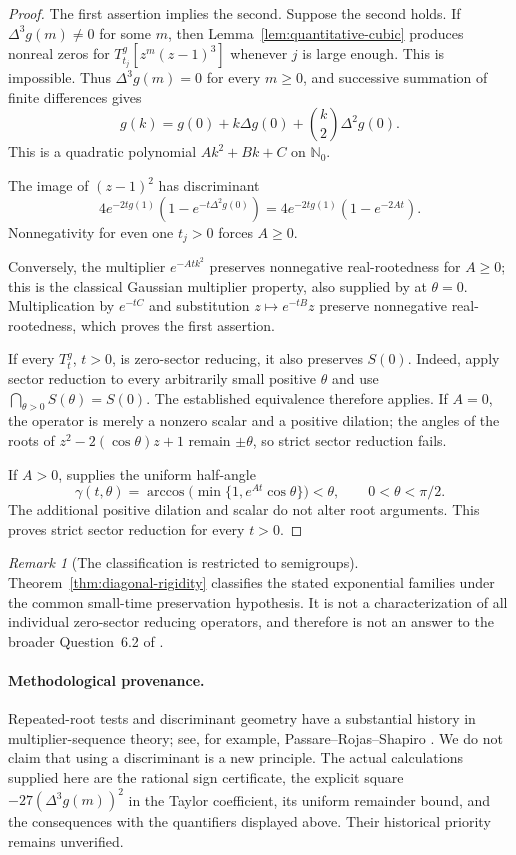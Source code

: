 \documentclass[11pt,a4paper]{article}
\theoremstyle{definition}
\theoremstyle{remark}
\newtheorem{remark}[theorem]{Remark}
\begin{document}
\begin{proof}
The first assertion implies the second.  Suppose the second holds.
If $\Delta^3g(m)\ne0$ for some $m$, then
Lemma~\ref{lem:quantitative-cubic} produces nonreal zeros for
$T_{t_j}^g[z^m(z-1)^3]$ whenever $j$ is large enough.
This is impossible.  Thus $\Delta^3g(m)=0$ for every $m\geq0$,
and successive summation of finite differences gives
\[
 g(k)=g(0)+k\Delta g(0)+\binom{k}{2}\Delta^2g(0).
\]
This is a quadratic polynomial $Ak^2+Bk+C$ on $\mathbb N_0$.

The image of $(z-1)^2$ has discriminant
\[
 4e^{-2tg(1)}\left(1-e^{-t\Delta^2g(0)}\right)
 =4e^{-2tg(1)}(1-e^{-2At}).
\]
Nonnegativity for even one $t_j>0$ forces $A\geq0$.

Conversely, the multiplier $e^{-At k^2}$ preserves nonnegative
real-rootedness for $A\geq0$; this is the classical Gaussian
multiplier property, also supplied by
\cite[Theorem~2.5]{CardonEtAl2018} at $\theta=0$.
Multiplication by $e^{-tC}$ and substitution $z\mapsto e^{-tB}z$
preserve nonnegative real-rootedness, which proves the first assertion.

If every $T_t^g$, $t>0$, is zero-sector reducing, it also preserves
$S(0)$.  Indeed, apply sector reduction to every arbitrarily small
positive $\theta$ and use $\bigcap_{\theta>0}S(\theta)=S(0)$.
The established equivalence therefore applies.  If $A=0$,
the operator is merely a nonzero scalar and a positive dilation;
the angles of the roots of $z^2-2(\cos\theta)z+1$ remain
$\pm\theta$, so strict sector reduction fails.

If $A>0$, \cite[Theorem~2.5]{CardonEtAl2018} supplies the uniform
half-angle
\[
 \gamma(t,\theta)
 =\arccos\bigl(\min\{1,e^{At}\cos\theta\}\bigr)<\theta,
 \qquad 0<\theta<\pi/2.
\]
The additional positive dilation and scalar do not alter root
arguments.  This proves strict sector reduction for every $t>0$.
\end{proof}


\begin{remark}[The classification is restricted to semigroups]
Theorem~\ref{thm:diagonal-rigidity} classifies the stated exponential
families under the common small-time preservation hypothesis.  It is
not a characterization of all individual zero-sector reducing
operators, and therefore is not an answer to the broader
Question~6.2 of \cite{CardonEtAl2018}.
\end{remark}

\paragraph{Methodological provenance.}
Repeated-root tests and discriminant geometry have a substantial
history in multiplier-sequence theory; see, for example,
Passare--Rojas--Shapiro \cite{PassareRojasShapiro2011}.  We do not claim
that using a discriminant is a new principle.  The actual calculations
supplied here are the rational sign certificate, the explicit square
$-27(\Delta^3g(m))^2$ in the Taylor coefficient, its uniform remainder
bound, and the consequences with the quantifiers displayed above.
Their historical priority remains unverified.
\end{document}
